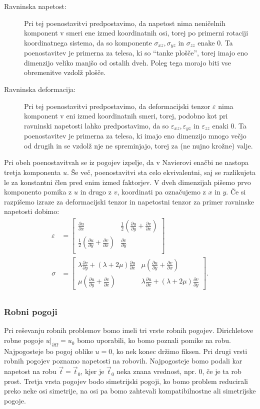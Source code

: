 \documentclass[a4paper,twoside]{article}
\theoremstyle{definition} %
\theoremstyle{plain} %
\numberwithin{equation}{section}
\newcommand{\eps}{\varepsilon}
\newcommand{\dpar}[2]{\ensuremath{\frac{\partial #1}{\partial #2}}}
\newcommand{\vt}{\vec{t}}
\newcommand{\ts}{\sigma}
\begin{document}
\begin{description}
  \item[Ravninska napetost:]
Pri tej poenostavitvi predpostavimo, da napetost nima neničelnih komponent v
smeri ene izmed koordinatnih osi, torej po primerni rotaciji koordinatnega
sistema, da so komponente $\ts_{xz}, \ts_{yz}$ in $\ts_{zz}$ enake 0. Ta
poenostavitev je primerna za telesa, ki so ``tanke plošče'', torej imajo eno
dimenzijo veliko manjšo od ostalih dveh. Poleg tega morajo biti vse obremenitve
vzdolž plošče.
  \item[Ravninska deformacija:]
Pri tej poenostavitvi predpostavimo, da deformacijski tenzor $\eps$ nima
komponent v eni izmed koordinatnih smeri, torej, podobno kot pri ravninski
napetosti lahko predpostavimo, da so $\eps_{xz}, \eps_{yz}$ in $\eps_{zz}$ enaki
0. Ta poenostavitev je primerna za telesa, ki imajo eno dimenzijo mnogo večjo od
drugih in se vzdolž nje ne spreminjajo, torej za (ne nujno krožne) valje.
\end{description}

Pri obeh poenostavitvah se iz pogojev izpelje, da v Navierovi enačbi ne nastopa
tretja komponenta $u$. Še več, poenostavitvi sta celo ekvivalentni, saj se
razlikujeta le za konstantni člen pred enim izmed faktorjev. V dveh dimenzijah
pišemo prvo komponento pomika z $u$ in drugo z $v$, koordinati pa označujemo z
$x$ in $y$. Če si razpišemo izraze za deformacijski tenzor in napetostni tenzor
za primer ravninske napetosti dobimo:
\begin{align*}
  \eps &=
  \begin{bmatrix}
    \dpar{u}{x} & \frac12(\dpar{u}{y} + \dpar{v}{x}) \\
    \frac12(\dpar{u}{y} + \dpar{v}{x}) & \dpar{v}{y} \\
  \end{bmatrix}
  \\
  \ts &=
  \begin{bmatrix}
    \lambda \dpar{v}{y} + (\lambda+2\mu) \dpar{u}{x} &
    \mu(\dpar{u}{y} + \dpar{v}{x}) \\
    \mu(\dpar{u}{y} + \dpar{v}{x}) &
    \lambda \dpar{u}{x} + (\lambda+2\mu) \dpar{v}{y}
  \end{bmatrix}.
  \\
\end{align*}

\subsubsection{Robni pogoji}
Pri reševanju robnih problemov bomo imeli tri vrste robnih pogojev. Dirichletove
robne pogoje $u|_{\partial \Omega} = u_0$ bomo uporabili, ko bomo poznali
pomike na robu. Najpogosteje bo pogoj oblike $u = 0$, ko nek konec držimo
fiksen. Pri drugi vrsti robnih pogojev poznamo napetosti na robovih.
Najpogosteje bomo podali kar napetost na robu $\vt = \vt_0$, kjer je $\vt_0$
neka znana vrednost, npr. 0, če je ta rob prost. Tretja vrsta pogojev bodo
simetrijski pogoji, ko bomo problem reducirali preko neke osi simetrije, na osi
pa bomo zahtevali kompatibilnostne ali simetrijske pogoje.
\end{document}
